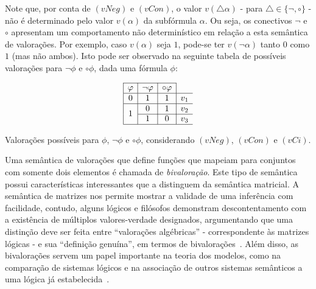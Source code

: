          

        Note que, por conta de $(vNeg)$ e $(vCon)$, o valor $v(\triangle \alpha)$ {-} para $\triangle \in \{\neg, \circ\}$ {-} não é determinado pelo valor $v(\alpha)$ da subfórmula $\alpha$. Ou seja, os conectivos $\neg$ e $\circ$ apresentam um comportamento não determinístico em relação a esta semântica de valorações. Por exemplo, caso $v(\alpha)$ seja $1$, pode-se ter $v(\neg \alpha)$ tanto $0$ como $1$ (mas não ambos). Isto pode ser observado na seguinte tabela de possíveis valorações para $\neg \phi$ e $\circ \phi$, dada uma fórmula $\phi$:

        \begin{table}[h]
            \[
                \begin{array}{|c|c|c|c}
                    \cline{1-3}
                    \phi & \neg\phi & \circ\phi & \\ \hline
                    0 & 1 & 1 & v_1 \\ \hline
                    \multirow{2}{*}{1} & 0 & 1 & v_2 \\ \cline{2-4}
                    & 1 & 0 & v_3 \\ \hline
                \end{array}
                \]
                \caption{Valorações possíveis para $\phi$, $\neg \phi$ e $\circ \phi$, considerando $(vNeg)$, $(vCon)$ e $(vCi)$.}
                \label{tab:negcirc}
        \end{table}

        Uma semântica de valorações que define funções que mapeiam para conjuntos com somente dois elementos é chamada de \textit{bivaloração}. Este tipo de semântica possui características interessantes que a distinguem da semântica matricial. A semântica de matrizes nos permite mostrar a validade de uma inferência com facilidade, contudo, alguns lógicos e filósofos demonstram descontentamento com a existência de múltiplos valores-verdade designados, argumentando que uma distinção deve ser feita entre ``valorações algébricas'' {-} correspondente às matrizes lógicas {-} e sua ``definição genuína'', em termos de bivalorações~\cite{Suszko1975-SUSROL}. Além disso, as bivalorações servem um papel importante na teoria dos modelos, como na comparação de sistemas lógicos e na associação de outros sistemas semânticos a uma lógica já estabelecida~\cite{bivalence}.

